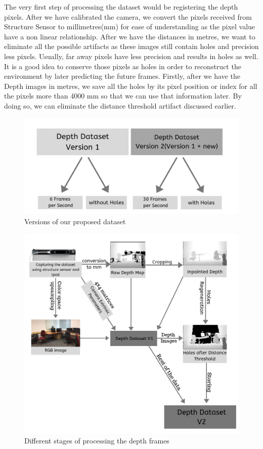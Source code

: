 The very first step of processing the dataset would be registering the depth pixels. After we have calibrated the camera, we convert the pixels received from Structure Sensor to millimetres(mm) for ease of understanding as the pixel value have a non linear relationship. After we have the distances in metres, we want to eliminate all the possible artifacts as these images still contain holes and precision less pixels. Usually, far away pixels have less precision and results in holes as well\cite{deptherror}. It is a good idea to conserve those pixels as holes in order to reconstruct the environment by later predicting the future frames. Firstly, after we have the Depth images in metres, we save all the holes by its pixel position or index for all the pixels more than 4000 mm so that we can use that information later. By doing so, we can eliminate the distance threshold artifact discussed earlier.

\begin{figure}[!]
    \centering
    \includegraphics[scale=0.35]{Figures/versions.png}
    \caption{Versions of our proposed dataset}
    \label{fig:datasetversion}
\end{figure}

\begin{figure}[h]
    \includegraphics[scale=0.50]{Figures/process.png}
    \caption{Different stages of processing the depth frames}
    \label{fig:processing}
\end{figure}

